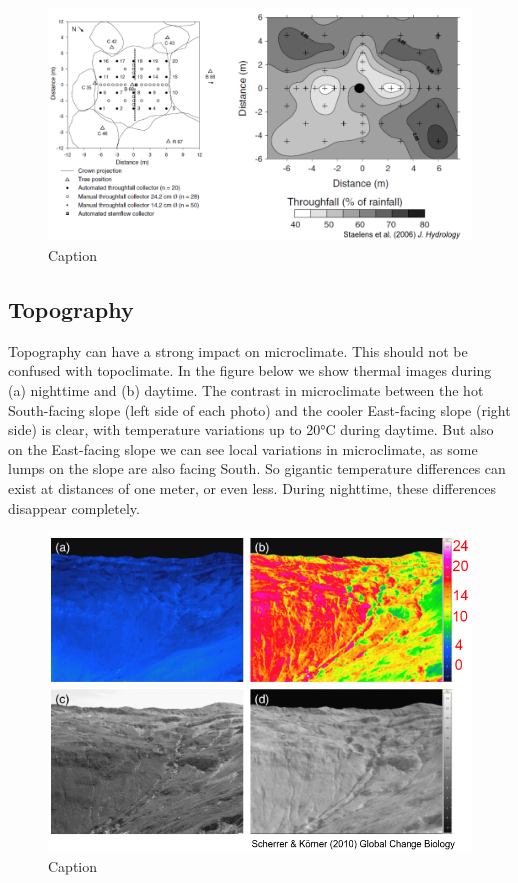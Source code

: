 \documentclass[12pt,oneside]{book}
\begin{document}
\begin{figure}

{\centering \includegraphics[width=1\linewidth]{figures/Figure1023} 

}

\caption{Caption}\label{fig:Micro23}
\end{figure}

\subsection{Topography}\label{topography}

Topography can have a strong impact on microclimate. This should not be
confused with topoclimate. In the figure below we show thermal images
during (a) nighttime and (b) daytime. The contrast in microclimate
between the hot South-facing slope (left side of each photo) and the
cooler East-facing slope (right side) is clear, with temperature
variations up to 20°C during daytime. But also on the East-facing slope
we can see local variations in microclimate, as some lumps on the slope
are also facing South. So gigantic temperature differences can exist at
distances of one meter, or even less. During nighttime, these
differences disappear completely.

\begin{figure}

{\centering \includegraphics[width=0.75\linewidth]{figures/Figure1024} 

}

\caption{Caption}\label{fig:Micro24}
\end{figure}
\end{document}
